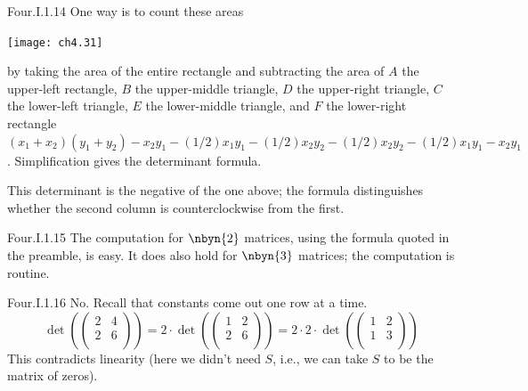 \begin{ans}{Four.I.1.14}
      One way is to count these areas
      \begin{center}
        \texttt{[image: ch4.31]}
      \end{center}
      by taking the area of the entire rectangle and subtracting the area of
      $A$ the upper-left rectangle, $B$ the upper-middle triangle,
      $D$ the upper-right triangle, $C$ the lower-left triangle,
      $E$ the lower-middle triangle, and $F$ the lower-right rectangle
      \( (x_1+x_2)(y_1+y_2)-x_2y_1-(1/2)x_1y_1-(1/2)x_2y_2
              -(1/2)x_2y_2-(1/2)x_1y_1-x_2y_1 \).
      Simplification gives the determinant formula.

      This determinant is the negative of the one above; the formula
      distinguishes whether the second column is counterclockwise from
      the first.
     
\end{ans}
\begin{ans}{Four.I.1.15}
      The computation for \( \nbyn{2} \) matrices, using the
      formula quoted in the preamble, is easy.
      It does also hold for \( \nbyn{3} \) matrices; the
      computation is routine.
    
\end{ans}
\begin{ans}{Four.I.1.16}
      No.
      Recall that constants come out one row at a time.
      \begin{equation*}
         \det(
         \begin{pmatrix}
            2  &4  \\
            2  &6  \\
         \end{pmatrix})
         =
         2\cdot\det(\begin{pmatrix}
            1  &2  \\
            2  &6  \\
         \end{pmatrix})
         =
         2\cdot 2\cdot \det(\begin{pmatrix}
            1  &2  \\
            1  &3  \\
         \end{pmatrix})
      \end{equation*}
      This contradicts linearity (here we didn't need \( S \), i.e., we can
      take $S$ to be the matrix of zeros).
    
\end{ans}

